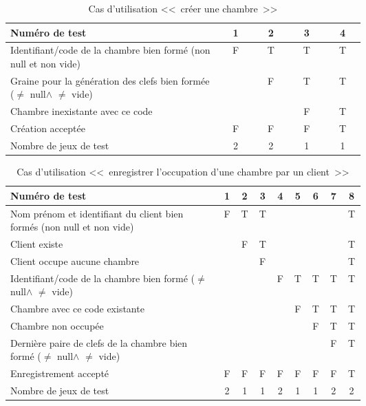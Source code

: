 \documentclass[11pt,article]{article}
\newcommand{\nullvalue}{\textsf{null}\xspace}
\begin{document}
\begin{table}[htbp!]
\begin{tabular}{|p{0.6\linewidth}|c|c|c|c|}
\hline
Numéro de test
&1&2&3&4\\
\hline
\hline
Identifiant/code de la chambre bien formé (non \nullvalue et non vide)
&F&T&T&T\\
\hline
Graine pour la génération des clefs bien formée ($\neq$ \nullvalue $\land$ $\neq$ vide)
& &F&T&T\\
\hline
Chambre inexistante avec ce code
& & &F&T\\
\hline
\hline
Création acceptée
&F&F&F&T\\
\hline
\hline
Nombre de jeux de test
&2&2&1&1\\
\hline
\end{tabular}
\caption{Cas d'utilisation <<~créer une chambre~>>}
\end{table}
        \begin{table}[htbp!]
            \begin{tabular}{|p{0.6\linewidth}|c|c|c|c|c|c|c|c|}
                \hline
                Numéro de test
                    &1&2&3&4&5&6&7&8\\
                \hline
                \hline
                Nom prénom et identifiant du client bien formés (non \nullvalue et non vide)
                    &F&T&T& & & & &T\\
                \hline
                Client existe
                    & &F&T& & & & &T\\
                \hline
                Client occupe aucune chambre
                    & & &F& & & & &T\\
                \hline
                \hline
                Identifiant/code de la chambre bien formé ($\neq$ \nullvalue $\land$ $\neq$ vide)
                    & & & &F&T&T&T&T\\
                \hline
                Chambre avec ce code existante
                    & & & & &F&T&T&T\\
                \hline
                Chambre non occupée
                    & & & & & &F&T&T\\
                \hline
                Dernière paire de clefs de la chambre bien formé ($\neq$ \nullvalue $\land$ $\neq$ vide)
                    & & & & & & &F&T\\
                \hline
                \hline
                Enregistrement accepté
                    &F&F&F&F&F&F&F&T\\
                \hline
                \hline
                Nombre de jeux de test
                                    &2&1&1&2&1&1&2&2 \\
                \hline
            \end{tabular}
            \caption{Cas d'utilisation <<~enregistrer l'occupation d'une chambre par un client~>>}
        \end{table}
\end{document}

